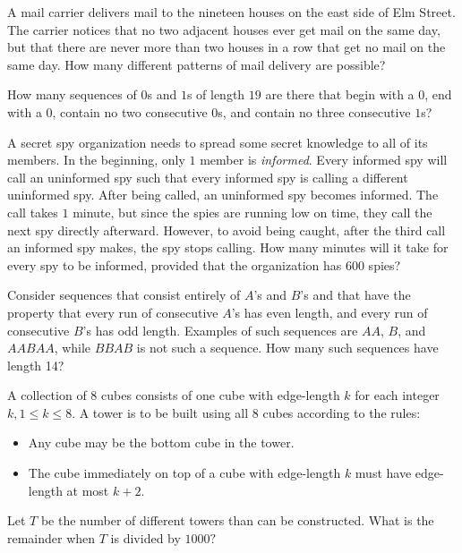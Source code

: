 \documentclass[mast]{lucky}
\begin{document}
\begin{prob}[AIME I 2001/14]{3}
A mail carrier delivers mail to the nineteen houses on the east side of Elm Street. The carrier notices that no two adjacent houses ever get mail on the same day, but that there are never more than two houses in a row that get no mail on the same day. How many different patterns of mail delivery are possible?
\end{prob}

\begin{prob}[AMC 12B 2019/23]{3}
How many sequences of $0$s and $1$s of length $19$ are there that begin with a $0$, end with a $0$, contain no two consecutive $0$s, and contain no three consecutive $1$s?
\end{prob}

\begin{prob}{3}
A secret spy organization needs to spread some secret knowledge to all of its members. In the beginning, only $1$ member is \textit{informed}. Every informed spy will call an uninformed spy such that every informed spy is calling a different uninformed spy. After being called, an uninformed spy becomes informed. The call takes $1$ minute, but since the spies are running low on time, they call the next spy directly afterward. However, to avoid being caught, after the third call an informed spy makes, the spy stops calling. How many minutes will it take for every spy to be informed, provided that the organization has $600$ spies?
\end{prob}


\begin{prob}[AIME 2008 I/11]{3}
Consider sequences that consist entirely of $ A$'s and $ B$'s and that have the property that every run of consecutive $ A$'s has even length, and every run of consecutive $ B$'s has odd length. Examples of such sequences are $ AA$, $ B$, and $ AABAA$, while $ BBAB$ is not such a sequence. How many such sequences have length 14?
\end{prob}


\begin{prob}[AIME I 2006/11]{3}

A collection of $8$ cubes consists of one cube with edge-length $k$ for each integer $k, 1 \le k \le 8.$ A tower is to be built using all $8$ cubes according to the rules:
\begin{itemize}
    \item Any cube may be the bottom cube in the tower.
    \item The cube immediately on top of a cube with edge-length $k$ must have edge-length at most $k+2.$
\end{itemize}
Let $T$ be the number of different towers than can be constructed. What is the remainder when $T$ is divided by $1000?$
\end{prob}
\end{document}
